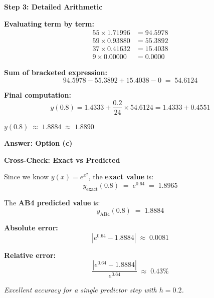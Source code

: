 \documentclass[12pt]{beamer}
\begin{document}
\begin{frame}{\textbf{Step 3: Detailed Arithmetic}}
  \begin{center}
    \vfill
    \textbf{Evaluating term by term:}
    \begin{align*}
      55 \times 1.71996 &= 94.5978 \\
      59 \times 0.93880 &= 55.3892 \\
      37 \times 0.41632 &= 15.4038 \\
       9 \times 0.00000 &= 0.0000
    \end{align*}

    \vspace{0.5em}
    \textbf{Sum of bracketed expression:}
    \[
      94.5978 - 55.3892 + 15.4038 - 0 \;=\; 54.6124
    \]

    \vspace{0.5em}
    \textbf{Final computation:}
    \[
      y(0.8) = 1.4333 + \frac{0.2}{24} \times 54.6124
             = 1.4333 + 0.4551
    \]

    \vspace{0.8em}
    \LARGE\textbf{\textcolor{madblue}{$y(0.8) \;\approx\; 1.8884 \;\approx\; 1.8890$}}

    \vspace{0.5em}
    \normalsize\textbf{\textcolor{okgreen}{Answer: Option (c)}}
    \vfill
  \end{center}
\end{frame}

\begin{frame}{\textbf{Cross-Check: Exact vs Predicted}}
  \begin{center}
    \vfill
    Since we know $y(x) = e^{x^2}$, the \textbf{exact value} is:
    \[
      y_{\text{exact}}(0.8) \;=\; e^{0.64} \;=\; 1.8965
    \]

    \vspace{1em}
    The \textbf{AB4 predicted value} is:
    \[
      y_{\text{AB4}}(0.8) \;=\; 1.8884
    \]

    \vspace{1em}
    \textbf{Absolute error:}
    \[
      |e^{0.64} - 1.8884| \;\approx\; 0.0081
    \]

    \vspace{1em}
    \textbf{Relative error:}
    \[
      \frac{|e^{0.64} - 1.8884|}{e^{0.64}} \;\approx\; 0.43\%
    \]

    \vspace{0.8em}
    \textit{Excellent accuracy for a single predictor step with $h = 0.2$.}
    \vfill
  \end{center}
\end{frame}
\end{document}
